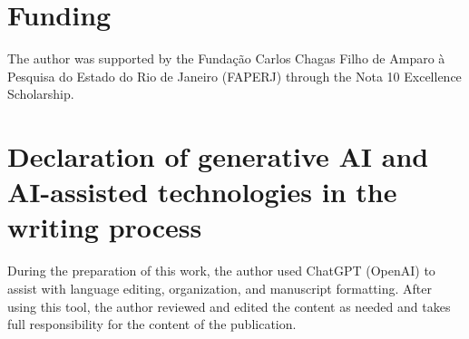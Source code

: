 \documentclass[11pt]{article}
\theoremstyle{plain}
\theoremstyle{definition}
\theoremstyle{remark}
\begin{document}
\section*{Funding}
The author was supported by the Funda\c{c}\~ao Carlos Chagas Filho de Amparo \`a Pesquisa do Estado do Rio de Janeiro (FAPERJ) through the Nota 10 Excellence Scholarship.

\section*{Declaration of generative AI and AI-assisted technologies in the writing process}
During the preparation of this work, the author used ChatGPT (OpenAI) to assist with language editing, organization, and manuscript formatting. After using this tool, the author reviewed and edited the content as needed and takes full responsibility for the content of the publication.

\printbibliography
\end{document}
